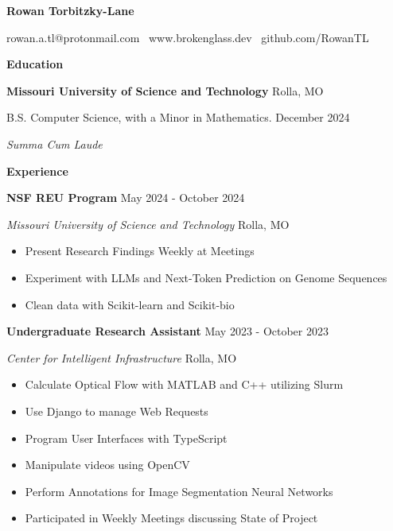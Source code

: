 \documentclass[11pt]{article}
\begin{document}
\begin{center}
    \textbf{\huge Rowan Torbitzky-Lane}\\
    \hrulefill
\end{center}

\begin{center}
    rowan.a.tl@protonmail.com \textbullet \ www.brokenglass.dev \textbullet \ github.com/RowanTL
\end{center}


\begin{center}
    \textbf{Education}
\end{center}
\textbf{Missouri University of Science and Technology} \hfill Rolla, MO

B.S. Computer Science, with a Minor in Mathematics. \hfill December 2024

\textit{Summa Cum Laude}


\begin{center}
    \textbf{Experience}
\end{center}

\textbf{NSF REU Program} \hfill May 2024 - October 2024

\textsl{Missouri University of Science and Technology} \hfill Rolla, MO
\begin{itemize}[noitemsep]
    \item Present Research Findings Weekly at Meetings
    \item Experiment with LLMs and Next-Token Prediction on Genome Sequences
    \item Clean data with Scikit-learn and Scikit-bio
\end{itemize}

\textbf{Undergraduate Research Assistant} \hfill May 2023 - October 2023

\textsl{Center for Intelligent Infrastructure} \hfill Rolla, MO
\begin{itemize}[noitemsep]
    \item Calculate Optical Flow with MATLAB and C++ utilizing Slurm
    \item Use Django to manage Web Requests
    \item Program User Interfaces with TypeScript
    \item Manipulate videos using OpenCV
    \item Perform Annotations for Image Segmentation Neural Networks
    \item Participated in Weekly Meetings discussing State of Project
\end{itemize}
\end{document}
